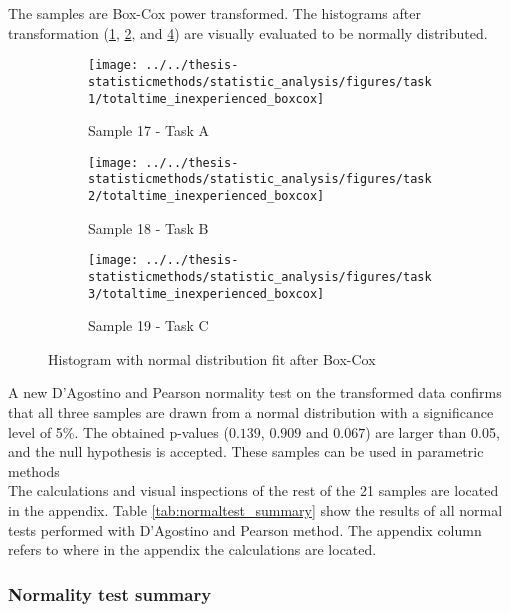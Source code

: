 The samples are Box-Cox power transformed. The histograms after transformation (\ref{fig:totaltimeinexperiencedboxcox_task1}, \ref{fig:totaltimeinexperiencedboxcox_task2}, and \ref{fig:totaltimeinexperiencedboxcox_task3}) are visually evaluated to be normally distributed. 

\begin{figure}[H]
	\centering
	\begin{subfigure}[b]{0.32\textwidth}
		\centering
		\texttt{[image: ../../thesis-statisticmethods/statistic\_analysis/figures/task1/totaltime\_inexperienced\_boxcox]}
		\caption{Sample 17 - Task A}
		\label{fig:totaltimeinexperiencedboxcox_task1}
	\end{subfigure}
	\begin{subfigure}[b]{0.32\textwidth}
		\centering
		\texttt{[image: ../../thesis-statisticmethods/statistic\_analysis/figures/task2/totaltime\_inexperienced\_boxcox]}
		\caption{Sample 18 - Task B}
		\label{fig:totaltimeinexperiencedboxcox_task2}
	\end{subfigure}
	\begin{subfigure}[b]{0.32\textwidth}
		\centering
		\texttt{[image: ../../thesis-statisticmethods/statistic\_analysis/figures/task3/totaltime\_inexperienced\_boxcox]}
		\caption{Sample 19 - Task C}
		\label{fig:totaltimeinexperiencedboxcox_task3}
	\end{subfigure}
	\caption{Histogram with normal distribution fit after Box-Cox}
\end{figure}

A new D'Agostino and Pearson normality test on the transformed data confirms that all three samples are drawn from a normal distribution with a significance level of 5\%. The obtained p-values ($0.139$, $0.909$ and $0.067$) are larger than 0.05, and the null hypothesis is accepted. These samples can be used in parametric methods \\[0.2cm]

The calculations and visual inspections of the rest of the 21 samples are located in the appendix. Table \ref{tab:normaltest_summary} show the results of all normal tests performed with D'Agostino and Pearson method. The appendix column refers to where in the appendix the calculations are located.

\newpage

\subsubsection{Normality test summary}\label{sec:normaltest_summary}

